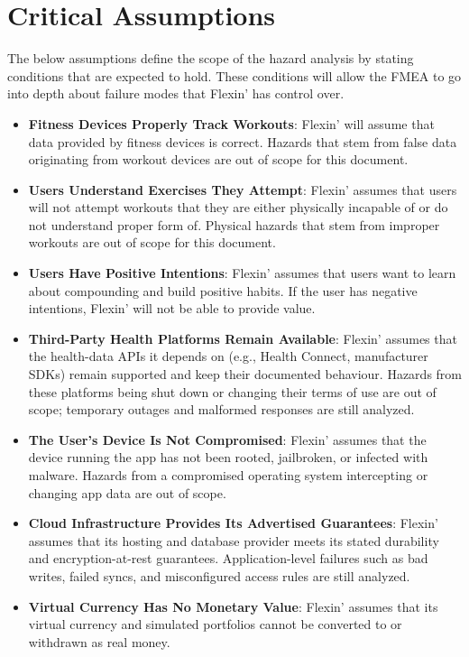 \documentclass{article}
\begin{document}
\section{Critical Assumptions}

The below assumptions define the scope of the hazard analysis by stating conditions that are expected to hold.
These conditions will allow the FMEA to go into depth about failure modes that Flexin' has control over.

\begin{itemize}
    \item \textbf{Fitness Devices Properly Track Workouts}: Flexin' will assume that data provided by fitness devices is correct.
    Hazards that stem from false data originating from workout devices are out of scope for this document.
    \item \textbf{Users Understand Exercises They Attempt}: Flexin' assumes that users will not attempt workouts that they are either physically incapable of or do not understand proper form of.
    Physical hazards that stem from improper workouts are out of scope for this document.
    \item \textbf{Users Have Positive Intentions}: Flexin' assumes that users want to learn about compounding and build positive habits.
    If the user has negative intentions, Flexin' will not be able to provide value.
    \item \textbf{Third-Party Health Platforms Remain Available}: Flexin' assumes that the health-data APIs it depends on (e.g., Health Connect, manufacturer SDKs) remain supported and keep their documented behaviour.
    Hazards from these platforms being shut down or changing their terms of use are out of scope; temporary outages and malformed responses are still analyzed.
    \item \textbf{The User's Device Is Not Compromised}: Flexin' assumes that the device running the app has not been rooted, jailbroken, or infected with malware.
    Hazards from a compromised operating system intercepting or changing app data are out of scope.
    \item \textbf{Cloud Infrastructure Provides Its Advertised Guarantees}: Flexin' assumes that its hosting and database provider meets its stated durability and encryption-at-rest guarantees.
    Application-level failures such as bad writes, failed syncs, and misconfigured access rules are still analyzed.
    \item \textbf{Virtual Currency Has No Monetary Value}: Flexin' assumes that its virtual currency and simulated portfolios cannot be converted to or withdrawn as real money.

\end{itemize}
\end{document}
